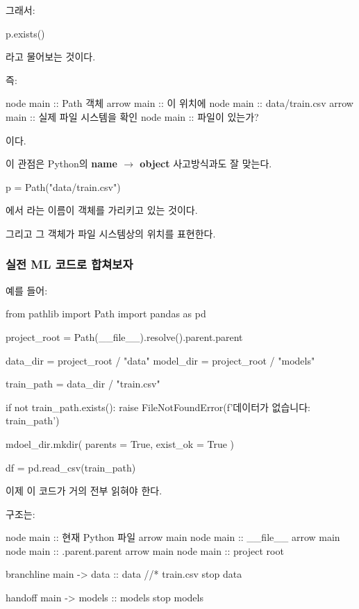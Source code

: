 그래서:

\begin{dhkcode}
p.exists()
\end{dhkcode}

라고 물어보는 것이다.

즉:

\begin{dhkbranch}[in=8]
node main :: Path 객체
arrow main :: 이 위치에
node main :: data/train.csv
arrow main :: 실제 파일 시스템을 확인
node main :: 파일이 있는가?
\end{dhkbranch}

이다.

이 관점은 Python의 \textbf{name $\rightarrow$ object} 사고방식과도 잘 맞는다.

\begin{dhkcode}
p = Path("data/train.csv")
\end{dhkcode}

에서 라는 이름이 객체를 가리키고 있는 것이다.

그리고 그 객체가 파일 시스템상의 위치를 표현한다.

\subsubsection{실전 ML 코드로 합쳐보자}

예를 들어:

\begin{dhkcode}
from pathlib import Path
import pandas as pd

project_root = Path(__file__).resolve().parent.parent

data_dir = project_root / "data"
model_dir = project_root / "models"

train_path = data_dir / "train.csv"

if not train_path.exists():
    raise FileNotFoundError(f'데이터가 없습니다: {train_path}')

mdoel_dir.mkdir(
    parents = True,
    exist_ok = True
)

df = pd.read_csv(train_path)
\end{dhkcode}

이제 이 코드가 거의 전부 읽혀야 한다.

구조는:

\begin{dhkbranch}[in=8]
node main :: 현재 Python 파일
arrow main
node main :: __file__
arrow main
node main :: .parent.parent
arrow main
node main :: project root

branchline main -> data :: data //* train.csv
stop data

handoff main -> models :: models
stop models
\end{dhkbranch}

